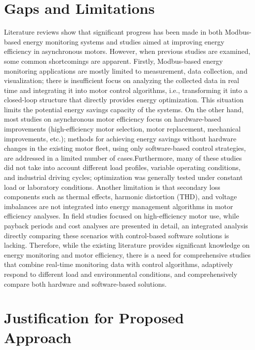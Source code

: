 \section{Gaps and Limitations}

Literature reviews show that significant progress has been made in both Modbus-based energy monitoring systems and studies aimed at improving energy efficiency in asynchronous motors. However, when previous studies are examined, some common shortcomings are apparent. Firstly, Modbus-based energy monitoring applications are mostly limited to measurement, data collection, and visualization; there is insufficient focus on analyzing the collected data in real time and integrating it into motor control algorithms, i.e., transforming it into a closed-loop structure that directly provides energy optimization. This situation limits the potential energy savings capacity of the systems. On the other hand, most studies on asynchronous motor efficiency focus on hardware-based improvements (high-efficiency motor selection, motor replacement, mechanical improvements, etc.); methods for achieving energy savings without hardware changes in the existing motor fleet, using only software-based control strategies, are addressed in a limited number of cases.Furthermore, many of these studies did not take into account different load profiles, variable operating conditions, and industrial driving cycles; optimization was generally tested under constant load or laboratory conditions. Another limitation is that secondary loss components such as thermal effects, harmonic distortion (THD), and voltage imbalances are not integrated into energy management algorithms in motor efficiency analyses. In field studies focused on high-efficiency motor use, while payback periods and cost analyses are presented in detail, an integrated analysis directly comparing these scenarios with control-based software solutions is lacking. Therefore, while the existing literature provides significant knowledge on energy monitoring and motor efficiency, there is a need for comprehensive studies that combine real-time monitoring data with control algorithms, adaptively respond to different load and environmental conditions, and comprehensively compare both hardware and software-based solutions.

\section{Justification for Proposed Approach}

